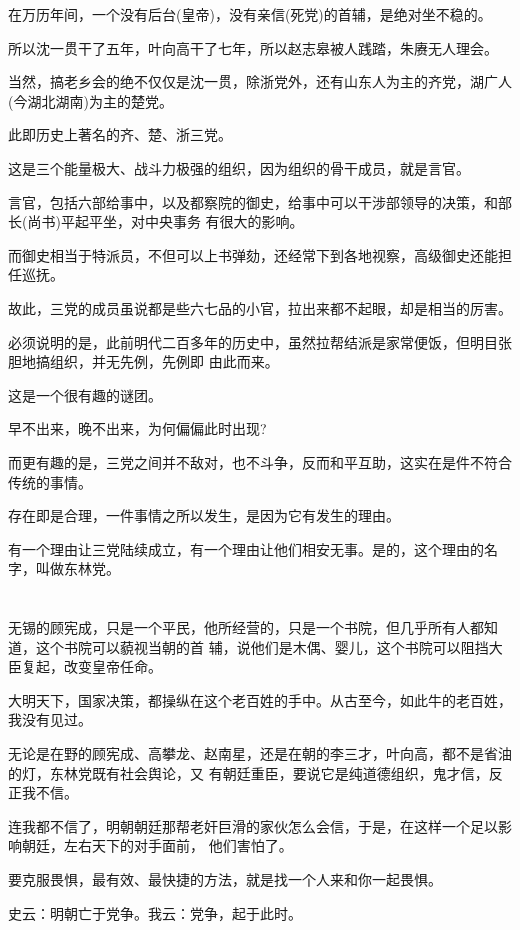 \documentclass[11pt,a4paper,onecolumn]{article}
\begin{document}
在万历年间，一个没有后台(皇帝)，没有亲信(死党)的首辅，是绝对坐不稳的。

所以沈一贯干了五年，叶向高干了七年，所以赵志皋被人践踏，朱赓无人理会。

当然，搞老乡会的绝不仅仅是沈一贯，除浙党外，还有山东人为主的齐党，湖广人(今湖北湖南)为主的楚党。

此即历史上著名的齐、楚、浙三党。

这是三个能量极大、战斗力极强的组织，因为组织的骨干成员，就是言官。

言官，包括六部给事中，以及都察院的御史，给事中可以干涉部领导的决策，和部长(尚书)平起平坐，对中央事务
有很大的影响。

而御史相当于特派员，不但可以上书弹劾，还经常下到各地视察，高级御史还能担任巡抚。

故此，三党的成员虽说都是些六七品的小官，拉出来都不起眼，却是相当的厉害。

必须说明的是，此前明代二百多年的历史中，虽然拉帮结派是家常便饭，但明目张胆地搞组织，并无先例，先例即
由此而来。

这是一个很有趣的谜团。

早不出来，晚不出来，为何偏偏此时出现?

而更有趣的是，三党之间并不敌对，也不斗争，反而和平互助，这实在是件不符合传统的事情。

存在即是合理，一件事情之所以发生，是因为它有发生的理由。

有一个理由让三党陆续成立，有一个理由让他们相安无事。是的，这个理由的名字，叫做东林党。

\section[\thesection]{}

无锡的顾宪成，只是一个平民，他所经营的，只是一个书院，但几乎所有人都知道，这个书院可以藐视当朝的首
辅，说他们是木偶、婴儿，这个书院可以阻挡大臣复起，改变皇帝任命。

大明天下，国家决策，都操纵在这个老百姓的手中。从古至今，如此牛的老百姓，我没有见过。

无论是在野的顾宪成、高攀龙、赵南星，还是在朝的李三才，叶向高，都不是省油的灯，东林党既有社会舆论，又
有朝廷重臣，要说它是纯道德组织，鬼才信，反正我不信。

连我都不信了，明朝朝廷那帮老奸巨滑的家伙怎么会信，于是，在这样一个足以影响朝廷，左右天下的对手面前，
他们害怕了。

要克服畏惧，最有效、最快捷的方法，就是找一个人来和你一起畏惧。

史云：明朝亡于党争。我云：党争，起于此时。
\end{document}
